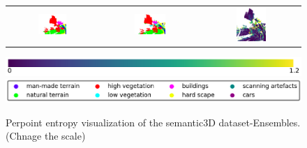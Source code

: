 \begin{figure}[h!]
\begin{tabular}{ccc}
            \includegraphics[width=0.33\textwidth, height=0.18\textheight]{images/seg_output/sem3d_seg_output/3_GT.pdf} &
            \includegraphics[width=0.33\textwidth, height=0.18\textheight]{images/seg_output/sem3d_seg_output/3_Pred.pdf}& 
            \includegraphics[width=0.33\textwidth, height=0.18\textheight]{images/seg_output/sem3d_seg_output/ent_de_3.pdf}\\
        \end{tabular}
        \includegraphics[scale=0.45]{images/ent_legend.pdf}
        \includegraphics[scale=0.45]{images/legend.png}
        \caption{Perpoint entropy visualization of the semantic3D dataset-Ensembles. (Chnage the scale)}
        \label{fig:de_sem3d_entmap}
    \end{figure}

